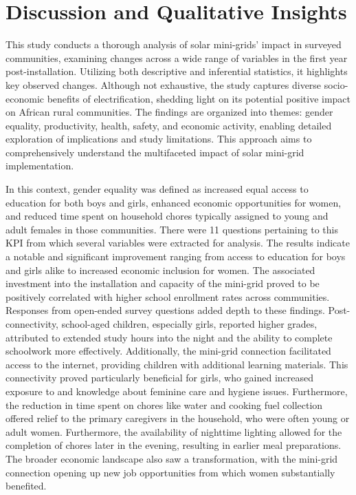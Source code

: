 \section{Discussion and Qualitative Insights}
\label{sec:discussion}
This study conducts a thorough analysis of solar mini-grids' impact in surveyed communities, examining changes across a wide range of variables in the first year post-installation. Utilizing both descriptive and inferential statistics, it highlights key observed changes. Although not exhaustive, the study captures diverse socio-economic benefits of electrification, shedding light on its potential positive impact on African rural communities. The findings are organized into themes: gender equality, productivity, health, safety, and economic activity, enabling detailed exploration of implications and study limitations. This approach aims to comprehensively understand the multifaceted impact of solar mini-grid implementation.

In this context, gender equality was defined as increased equal access to education for both boys and girls, enhanced economic opportunities for women, and reduced time spent on household chores typically assigned to young and adult females in those communities. There were 11 questions pertaining to this KPI from which several variables were extracted for analysis. The results indicate a notable and significant improvement ranging from access to education for boys and girls alike to increased economic inclusion for women. The associated investment into the installation and capacity of the mini-grid proved to be positively correlated with higher school enrollment rates across communities.
Responses from open-ended survey questions added depth to these findings. Post-connectivity, school-aged children, especially girls, reported higher grades, attributed to extended study hours into the night and the ability to complete schoolwork more effectively. Additionally, the mini-grid connection facilitated access to the internet, providing children with additional learning materials. This connectivity proved particularly beneficial for girls, who gained increased exposure to and knowledge about feminine care and hygiene issues.
Furthermore, the reduction in time spent on chores like water and cooking fuel collection offered relief to the primary caregivers in the household, who were often young or adult women. Furthermore, the availability of nighttime lighting allowed for the completion of chores later in the evening, resulting in earlier meal preparations. The broader economic landscape also saw a transformation, with the mini-grid connection opening up new job opportunities from which women substantially benefited.

